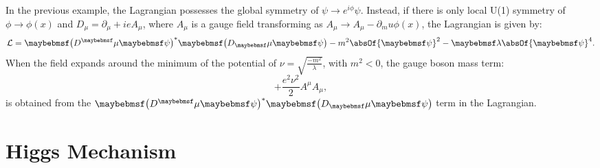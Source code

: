 In the previous example, the Lagrangian possesses  the global symmetry of $\psi \to e^{i\phi}\psi$. Instead, if there is only local U(1) symmetry of  $\phi\to\phi(x)$ and $D_\mu = \partial_\mu+ieA_\mu$, where $A_\mu$ is a gauge field transforming as $A_\mu \to A_\mu - \partial_mu\phi(x)$, the Lagrangian is given by:
\begin{equation}
\Lagr = \parenths{D^\mu{\psi}}^*\parenths{D_\mu\psi} - m^2 \absOf{\psi}^2    - \lambda\absOf{\psi}^4.
\end{equation}
When the field expands around the minimum of the potential of   $\nu=\sqrt{\frac{-m^2}{\lambda}}$, with $m^2<0$,  the gauge boson mass term:
\begin{equation}
+\frac{e^2\nu^2}{2}A^\mu{A}_\mu,
\end{equation}
 is obtained from the $\parenths{D^\mu{\psi}}^*\parenths{D_\mu\psi} $ term in the Lagrangian.

\section{Higgs Mechanism}
\label{sec:theoryHiggs}

